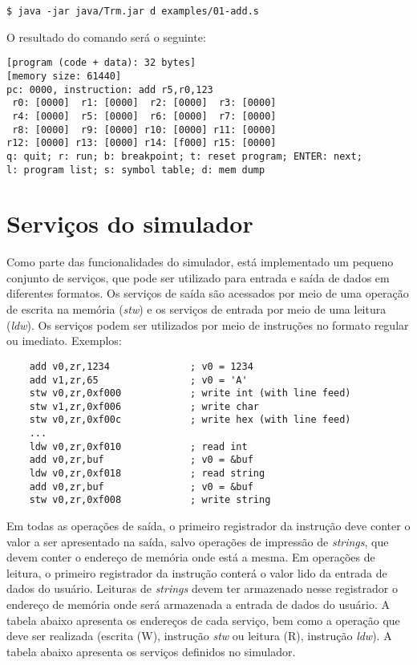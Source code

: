 \documentclass[11pt,a4paper]{report}
\begin{document}
\begin{verbatim}
$ java -jar java/Trm.jar d examples/01-add.s
\end{verbatim}

O resultado do comando será o seguinte:

\begin{verbatim}
[program (code + data): 32 bytes]
[memory size: 61440]
pc: 0000, instruction: add r5,r0,123
 r0: [0000]  r1: [0000]  r2: [0000]  r3: [0000]
 r4: [0000]  r5: [0000]  r6: [0000]  r7: [0000]
 r8: [0000]  r9: [0000] r10: [0000] r11: [0000]
r12: [0000] r13: [0000] r14: [f000] r15: [0000]
q: quit; r: run; b: breakpoint; t: reset program; ENTER: next;
l: program list; s: symbol table; d: mem dump
\end{verbatim}

\section{Serviços do simulador}

Como parte das funcionalidades do simulador, está implementado um pequeno
conjunto de serviços, que pode ser utilizado para entrada e saída de
dados em diferentes formatos. Os serviços de saída são acessados por
meio de uma operação de escrita na memória (\textit{stw}) e os serviços
de entrada por meio de uma leitura (\textit{ldw}). Os serviços podem ser
utilizados por meio de instruções no formato regular ou imediato.
Exemplos:

\begin{verbatim}
    add v0,zr,1234              ; v0 = 1234
    add v1,zr,65                ; v0 = 'A'
    stw v0,zr,0xf000            ; write int (with line feed)
    stw v1,zr,0xf006            ; write char
    stw v0,zr,0xf00c            ; write hex (with line feed)
    ...
    ldw v0,zr,0xf010            ; read int
    add v0,zr,buf               ; v0 = &buf
    ldw v0,zr,0xf018            ; read string
    add v0,zr,buf               ; v0 = &buf
    stw v0,zr,0xf008            ; write string
\end{verbatim}

Em todas as operações de saída, o primeiro registrador da instrução deve
conter o valor a ser apresentado na saída, salvo operações de impressão
de \textit{strings}, que devem conter o endereço de memória onde está
a mesma. Em operações de leitura, o primeiro registrador da instrução
conterá o valor lido da entrada de dados do usuário. Leituras de
\textit{strings} devem ter armazenado nesse registrador o endereço de
memória onde será armazenada a entrada de dados do usuário. A tabela
abaixo apresenta os endereços de cada serviço, bem como a operação que
deve ser realizada (escrita (W), instrução \textit{stw} ou leitura (R),
instrução \textit{ldw}). A tabela abaixo apresenta os serviços definidos
no simulador.
\end{document}
